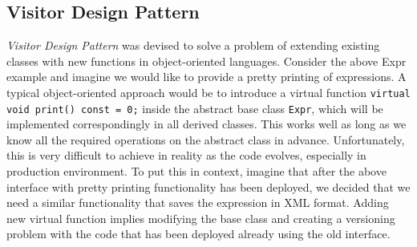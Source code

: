 \documentclass[preprint]{sigplanconf}
\makeatletter
\DeclareRobustCommand{\code}[1]{{\lstinline[breaklines=false,escapechar=@]{#1}}}
\makeatother
\begin{document}

\subsection{Visitor Design Pattern}
\label{sec:vdp}



\emph{Visitor Design Pattern}\cite{DesignPatterns1993} was devised to solve a problem 
of extending existing classes with new functions in object-oriented languages. 
Consider the above Expr example and imagine we would like to provide a pretty 
printing of expressions. A typical object-oriented approach would be to 
introduce a virtual function \code{virtual void print() const = 0;} inside the 
abstract base class \code{Expr}, which will be implemented correspondingly in all derived 
classes. This works well as long as we know all the required operations on the 
abstract class in advance. Unfortunately, this is very difficult to achieve in 
reality as the code evolves, especially in production environment. To put this 
in context, imagine that after the above interface with pretty printing 
functionality has been deployed, we decided that we need a similar functionality 
that saves the expression in XML format. Adding new virtual function implies 
modifying the base class and creating a versioning problem with the code that 
has been deployed already using the old interface.
\end{document}
